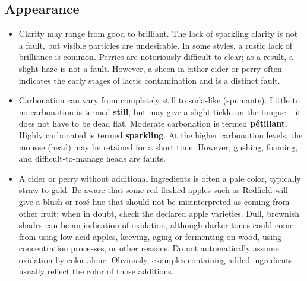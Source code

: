 \subsection*{Appearance}

\begin{itemize}
\item Clarity may range from good to brilliant. The lack of sparkling clarity is not a fault, but visible particles are undesirable. In some styles, a rustic lack of brilliance is common. Perries are notoriously difficult to clear; as a result, a slight haze is not a fault. However, a sheen in either cider or perry often indicates the early stages of lactic contamination and is a distinct fault.
\item Carbonation can vary from completely still to soda-like (spumante). Little to no carbonation is termed \textbf{still}, but may give a slight tickle on the tongue – it does not have to be dead flat. Moderate carbonation is termed \textbf{pétillant}. Highly carbonated is termed \textbf{sparkling}. At the higher carbonation levels, the mousse (head) may be retained for a short time. However, gushing, foaming, and difficult-to-manage heads are faults.
\item A cider or perry without additional ingredients is often a pale color, typically straw to gold. Be aware that some red-fleshed apples such as Redfield will give a blush or rosé hue that should not be misinterpreted as coming from other fruit; when in doubt, check the declared apple varieties. Dull, brownish shades can be an indication of oxidation, although darker tones could come from using low acid apples, keeving, aging or fermenting on wood, using concentration processes, or other reasons. Do not automatically assume oxidation by color alone. Obviously, examples containing added ingredients usually reflect the color of those additions.
\end{itemize}